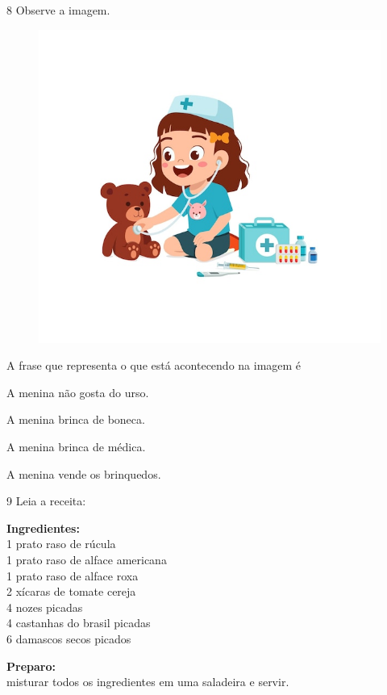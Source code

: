 \num{8} Observe a imagem.

\begin{figure}[htpb!]
\centering
\includegraphics[width=.5\textwidth]{media/image169.jpeg}
\end{figure}


A frase que representa o que está acontecendo na imagem é

\begin{escolha}
\item A menina não gosta do urso.

\item A menina brinca de boneca.

\item A menina brinca de médica.

\item A menina vende os brinquedos.
\end{escolha}

\num{9} Leia a receita:

\textbf{Ingredientes:}\\
1 prato raso de rúcula\\
1 prato raso de alface americana\\
1 prato raso de alface roxa\\
2 xícaras de tomate cereja\\
4 nozes picadas\\
4 castanhas do brasil picadas\\
6 damascos secos picados

\textbf{Preparo:}\\
misturar todos os ingredientes em uma saladeira e servir.


